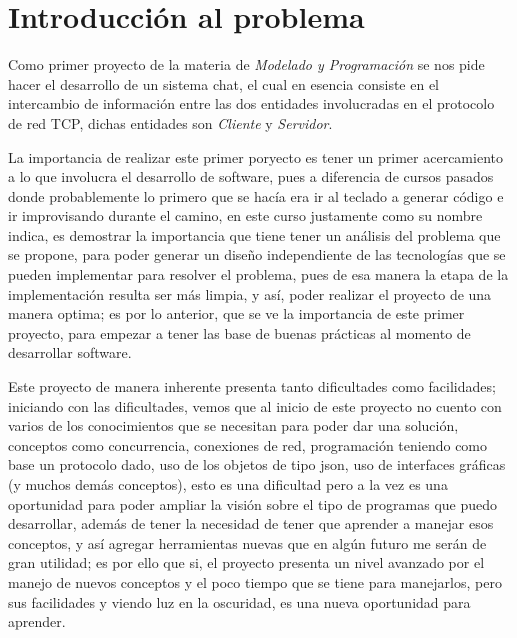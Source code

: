 \documentclass[10pt,letterpaper]{report}
\begin{document}
  \chapter{Introducción al problema}

\noindent  Como primer proyecto de la materia de \textit{Modelado y Programación} se nos pide hacer el desarrollo de un sistema chat, el cual en esencia consiste en el intercambio de información entre las dos entidades involucradas en el protocolo de red TCP, dichas entidades son \textit{Cliente} y \textit{Servidor}.

\vspace{0.2cm}

\noindent  La importancia de realizar este primer poryecto es tener un primer acercamiento a lo que involucra el desarrollo de software, pues a diferencia de cursos pasados donde probablemente lo primero que se hacía era ir al teclado a generar código e ir improvisando durante el camino, en este curso justamente como su nombre indica, es demostrar la importancia que tiene tener un análisis del problema que se propone, para poder generar un diseño independiente de las tecnologías que se pueden implementar para resolver el problema, pues de esa manera la etapa de la implementación resulta ser más limpia, y así,  poder realizar el proyecto de una manera optima; es por lo anterior, que se ve la importancia de este primer proyecto, para empezar a tener las base de buenas prácticas al momento de desarrollar software.

\vspace{0.2cm}

\noindent  Este proyecto de manera inherente presenta tanto dificultades como facilidades; iniciando con las dificultades, vemos que al inicio de este proyecto no cuento con varios de los conocimientos que se necesitan para poder dar una solución, conceptos como concurrencia, conexiones de red, programación teniendo como base un protocolo dado, uso de los objetos de tipo json, uso de interfaces gráficas (y muchos demás conceptos), esto es una dificultad pero a la vez es una oportunidad para poder ampliar la visión sobre el tipo de programas que puedo desarrollar, además de tener la necesidad de tener que aprender a manejar esos conceptos, y así agregar herramientas nuevas que en algún futuro me serán de gran utilidad; es por ello que si, el proyecto presenta un nivel avanzado por el manejo de nuevos conceptos y el poco tiempo que se tiene para manejarlos, pero sus facilidades y viendo luz en la oscuridad, es una nueva oportunidad para aprender.
\end{document}
